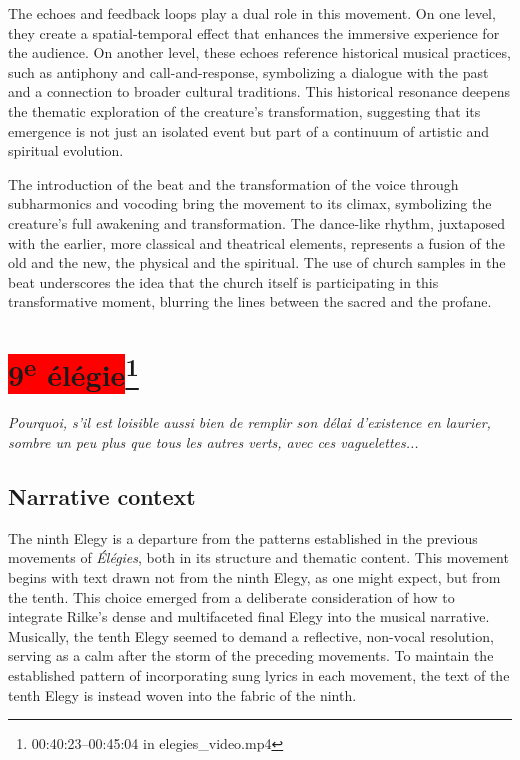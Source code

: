 \documentclass[12pt,twoside,maitrise]{dms_ks}
\theoremstyle{definition}
\begin{document}
{{The echoes and feedback loops play a dual role in this movement. 
On one level, they create a spatial-temporal effect that enhances the immersive experience for the audience. 
On another level, these echoes reference historical musical practices, such as antiphony and call-and-response, symbolizing a dialogue with the past and a connection to broader cultural traditions. 
This historical resonance deepens the thematic exploration of the creature’s transformation, suggesting that its emergence is not just an isolated event but part of a continuum of artistic and spiritual evolution.

The introduction of the beat and the transformation of the voice through subharmonics and vocoding bring the movement to its climax, symbolizing the creature’s full awakening and transformation. 
The dance-like rhythm, juxtaposed with the earlier, more classical and theatrical elements, represents a fusion of the old and the new, the physical and the spiritual. 
The use of church samples in the beat underscores the idea that the church itself is participating in this transformative moment, blurring the lines between the sacred and the profane.

\section{\colorbox{red}{9\textsuperscript{e} élégie}\footnote{00:40:23--00:45:04 in elegies\_video.mp4}}

\epigraph{\textit{Pourquoi, s’il est loisible aussi bien de remplir son délai d’existence en laurier, sombre un peu plus que tous les autres verts, avec ces vaguelettes...}}{}

\subsection{Narrative context}

The ninth Elegy is a departure from the patterns established in the previous movements of \textit{Élégies}, both in its structure and thematic content. 
This movement begins with text drawn not from the ninth Elegy, as one might expect, but from the tenth. 
This choice emerged from a deliberate consideration of how to integrate Rilke’s dense and multifaceted final Elegy into the musical narrative. 
Musically, the tenth Elegy seemed to demand a reflective, non-vocal resolution, serving as a calm after the storm of the preceding movements. 
To maintain the established pattern of incorporating sung lyrics in each movement, the text of the tenth Elegy is instead woven into the fabric of the ninth.

}}
\end{document}
